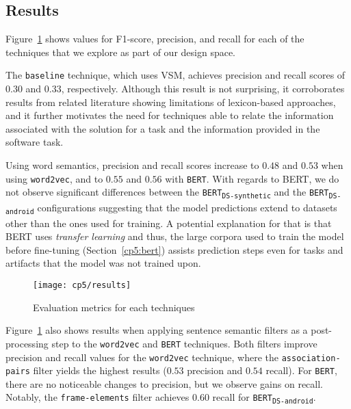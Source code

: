 \subsection{Results}




Figure~\ref{fig:eval-metrics-results} shows values for F1-score, precision, and recall for each of the techniques that we explore as part of our design space. 



The \texttt{baseline} technique, which uses VSM, achieves precision and recall scores of $0.30$ and $0.33$, respectively. 
Although this result is not surprising, it corroborates results from related literature showing limitations of lexicon-based approaches, and 
it further motivates the need for techniques able to relate the information associated with the solution for a task and the information provided in the software task.


Using word semantics, precision and recall scores increase to $0.48$ and $0.53$ when using \texttt{word2vec}, and to $0.55$ and $0.56$ with \texttt{BERT}.
With regards to BERT, we do not observe significant differences between the \texttt{BERT\textsubscript{DS-synthetic}}
and the \texttt{BERT\textsubscript{DS-android}} configurations suggesting that the model predictions extend to datasets other than the ones used for training.
A potential explanation for that is that 
BERT uses \textit{transfer learning}  and thus, the  
large corpora used to train the model before fine-tuning (Section~\ref{cp5:bert}) assists prediction steps even for tasks and artifacts that the model was not trained upon.



\clearpage
\begin{landscape}

\begin{figure}
    \centering
    \texttt{[image: cp5/results]}
    \caption{Evaluation metrics for each techniques }
    \label{fig:eval-metrics-results}
\end{figure}
\end{landscape}

\clearpage




Figure~\ref{fig:eval-metrics-results} also shows results when applying sentence semantic filters as
 a post-processing step to the
 \texttt{word2vec} and \texttt{BERT} techniques. 
Both filters improve precision and recall values for the \texttt{word2vec} technique, where the \texttt{association-pairs} filter yields 
the highest results ($0.53$ precision and $0.54$ recall). For \texttt{BERT}, there are no noticeable changes to precision, but 
we observe gains on recall. Notably, the \texttt{frame-elements} filter achieves $0.60$ recall for \texttt{BERT\textsubscript{DS-android}}. 



